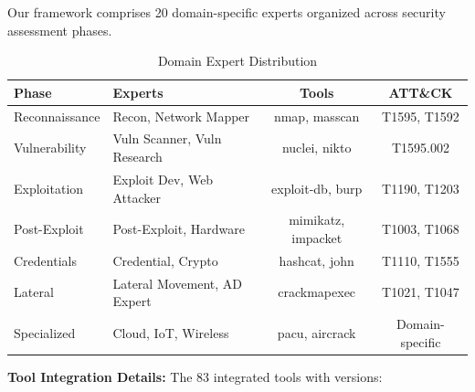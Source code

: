 \documentclass[preprint,12pt]{elsarticle}
\begin{document}
Our framework comprises 20 domain-specific experts organized across security assessment phases.

\begin{table}[htbp]
\centering
\caption{Domain Expert Distribution}
\label{tab:experts}
\begin{tabular}{llcc}
\toprule
\textbf{Phase} & \textbf{Experts} & \textbf{Tools} & \textbf{ATT\&CK} \\
\midrule
Reconnaissance & Recon, Network Mapper & nmap, masscan & T1595, T1592 \\
Vulnerability & Vuln Scanner, Vuln Research & nuclei, nikto & T1595.002 \\
Exploitation & Exploit Dev, Web Attacker & exploit-db, burp & T1190, T1203 \\
Post-Exploit & Post-Exploit, Hardware & mimikatz, impacket & T1003, T1068 \\
Credentials & Credential, Crypto & hashcat, john & T1110, T1555 \\
Lateral & Lateral Movement, AD Expert & crackmapexec & T1021, T1047 \\
Specialized & Cloud, IoT, Wireless & pacu, aircrack & Domain-specific \\
\bottomrule
\end{tabular}
\end{table}

\textbf{Tool Integration Details:} The 83 integrated tools with versions:
\end{document}
